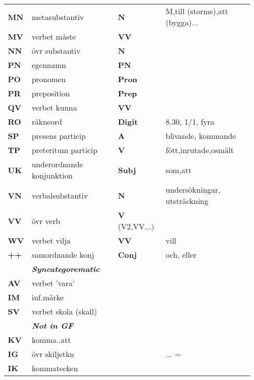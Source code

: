 \begin{tabular}{l l l l}
\textbf{MN}       &  metasubstantiv    & \textbf{N }     & M,till (storms),att (bygga)...\\
\textbf{MV}       &  verbet m\aa ste   & \textbf{VV}    & \\
\textbf{NN}       &  \"ovr substantiv  & \textbf{N}     & \\ 
\textbf{PN}       &  egennamn          & \textbf{PN}    & \\ %
\textbf{PO}       &  pronomen          & \textbf{Pron}  & \\
\textbf{PR}       &  preposition       & \textbf{Prep}  & \\ %
\textbf{QV}       &  verbet kunna      & \textbf{VV}    & \\ 
\textbf{RO}       &  r\"akneord        & \textbf{Digit} & 8.30, 1/1, fyra \\
\textbf{SP}       &  presens particip & \textbf{A }   & blivande, kommande \\ %
\textbf{TP}       & preteritum particip &\textbf{V }   & f\"ott,inrutade,osm\"alt \\
\textbf{UK}       & underordnande konjunktion &\textbf{Subj} & som,att \\
\textbf{VN}       & verbalsubstantiv  &\textbf{N}      & unders\"okningar, utstr\"ackning    \\
\textbf{VV}       &\"ovr verb         &\textbf{V} (V2,VV...) & \\
\textbf{WV}       & verbet vilja      &\textbf{VV}     &  vill \\
\vspace{2mm}
\textbf{++}       & samordnande konj  &\textbf{Conj}   & och, eller \\
& \emph{\textbf{Syncategorematic }} & \\
\textbf{AV}       & verbet 'vara'    &           & \\
\textbf{IM}       &  inf.m\"arke       &               & \\
\vspace{2mm}
\textbf{SV}       &  verbet skola (skall) &            & \\
&\emph{\textbf{Not in GF }} & \\
\textbf{KV}       &  komma..att        &               & \\
\textbf{IG}       &  \"ovr skiljetkn   &               & ... =  \\
\textbf{IK}       &  kommatecken       &               & \\

\end{tabular}
